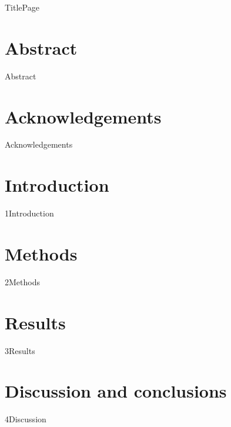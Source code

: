 \documentclass{Misc/format}
\begin{document}
{TitlePage}

\chapter*{Abstract}
{Abstract}

\chapter*{Acknowledgements}
{Acknowledgements}

\tableofcontents

\chapter{Introduction}
{1Introduction}

\chapter{Methods}
{2Methods}

\chapter{Results}
{3Results}

\chapter{Discussion and conclusions}
{4Discussion}


\printbibliography  
\end{document}
